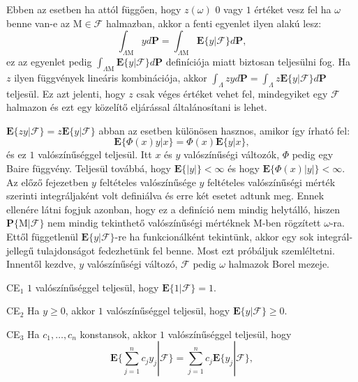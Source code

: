 \documentclass{article}
\begin{document}
Ebben az esetben ha attól függően, hogy $z(\omega)$ $0$ vagy $1$ értéket vesz fel ha $\omega$ benne van-e az $\mathrm{M} \in \mathscr{F}$ halmazban, akkor a fenti egyenlet ilyen alakú lesz:
\begin{equation}
 \int_{\Lambda \mathrm{M} } y d\mathrm{\textbf{P}} = \int_{\Lambda \mathrm{M}} \mathrm{\textbf{E}}\{y | \mathscr{F} \} d\mathrm{\textbf{P}},
\end{equation}
ez az egyenlet pedig $\int_{\Lambda \mathrm{M}} \mathrm{\textbf{E}}\{y | \mathscr{F} \} d\mathrm{\textbf{P}}$ definíciója miatt biztosan teljesülni fog. Ha $z$ ilyen függvények lineáris kombinációja, akkor $\int_{\Lambda} zy d\mathrm{\textbf{P}} = \int_{\Lambda} z \mathrm{\textbf{E}}\{y | \mathscr{F} \} d\mathrm{\textbf{P}}$ teljesül. Ez azt jelenti, hogy $z$ csak véges értéket vehet fel, mindegyiket egy $\mathscr{F}$ halmazon és ezt egy közelítő eljárással általánosítani is lehet. 

$\mathrm{\textbf{E}}\{zy | \mathscr{F} \} = z \mathrm{\textbf{E}}\{y | \mathscr{F} \}$ abban az esetben különösen hasznos, amikor így írható fel:
\begin{equation}
	\mathrm{\textbf{E}}\{\Phi(x)y | x \} = \Phi(x) \mathrm{\textbf{E}}\{y | x \}, 
\end{equation}
és ez $1$ valószínűséggel teljesül. Itt $x$ és $y$ valószínűségi változók, $\Phi$ pedig egy Baire függvény. Teljesül továbbá, hogy $\mathrm{\textbf{E}}\{|y|\} < \infty$ és hogy $\mathrm{\textbf{E}}\{\Phi(x)|y|\} < \infty$. Az előző fejezetben $y$ feltételes valószínűsége $y$ feltételes valószínűségi mérték szerinti integráljaként volt definiálva és erre két esetet adtunk meg. Ennek ellenére látni fogjuk azonban, hogy ez a definíció nem mindig helytálló, hiszen $\mathrm{\textbf{P}}\{ \mathrm{M} | \mathscr{F} \}$ nem mindig tekinthető valószínűségi mértéknek $\mathrm{M}$-ben rögzített $\omega$-ra. Ettől függetlenül $\mathrm{\textbf{E}}\{y | \mathscr{F} \}$-re ha funkcionálként tekintünk, akkor egy sok integrál-jellegű tulajdonságot fedezhetünk fel benne. Most ezt próbáljuk szemléltetni. Innentől kezdve, $y$ valószínűségi változó, $\mathscr{F}$ pedig $\omega$ halmazok Borel mezeje.

CE$_1$ $1$ valószínűséggel teljesül, hogy $\mathrm{\textbf{E}}\{1 | \mathscr{F} \} = 1$.

CE$_2$ Ha $y \geq 0$, akkor $1$ valószínűséggel teljesül, hogy $\mathrm{\textbf{E}}\{y | \mathscr{F} \} \geq 0$.

CE$_3$ Ha $c_1,\ldots,c_n$ konstansok, akkor $1$ valószínűséggel teljesül, hogy
\[
 \mathrm{\textbf{E}}\{ \sum_{j = 1}^{n} c_j y_j | \mathscr{F} \} = \sum_{j = 1}^{n} c_j \mathrm{\textbf{E}}\{  y_j | \mathscr{F} \}, 
\]
\end{document}

